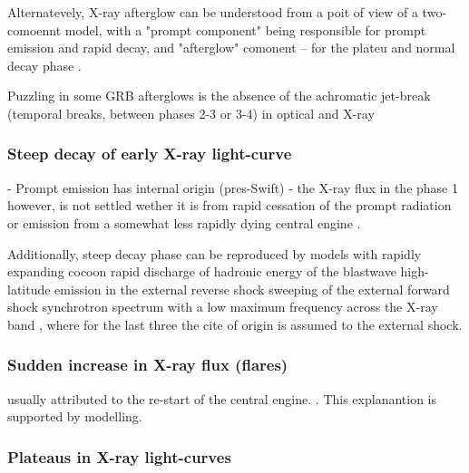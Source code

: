 Alternatevely, X-ray afterglow can be understood from a poit of view of a two-comoennt model, with a "prompt component" being responsible for prompt emission and rapid decay, and "afterglow" comonent -- for the plateu and normal decay phase \cite{O'Brien et al., 2006; Willingale et al., 2007; Ghisellini et al., 2009}.

Puzzling in some GRB afterglows is the absence of the achromatic jet-break (temporal breaks, between phases 2-3 or 3-4) in optical and X-ray \cite{Panaitescu et al., 2006a; Fan et al., 2006; Liang et al., 2007a, 2008a; Huang et al., 2007}


\subsubsection{Steep decay of early X-ray light-curve}

- Prompt emission has internal origin (pres-Swift)
- the X-ray flux in the phase 1 however, is not settled wether it is from rapid cessation of the prompt radiation \cite{(Kumar and Panaitescu, 2000a; Zhang et al., 2006} or emission from a somewhat less
rapidly dying central engine \cite{Fan and Wei, 2005; Barniol Duran and Kumar, 2009}.

Additionally, steep decay phase can be reproduced by models with rapidly expanding cocoon \cite{Pe'er et al., 2006a} rapid discharge of hadronic energy of the blastwave \cite{Dermer, 2007} high-latitude emission in the external reverse shock \cite{Uhm and Beloborodov, 2007; Uhm et al., 2012} sweeping of the external forward shock synchrotron spectrum with a low maximum frequency across the X-ray band \cite{Petropoulou et al., 2011}, where for the last three the cite of origin is assumed to the external shock.


\subsubsection{Sudden increase in X-ray flux (flares)}

usually attributed to the re-start of the central engine. \cite{Burrows et al., 2005b; Zhang et al., 2006; Fan and Wei, 2005).}. This explanantion is supported by modelling.


\subsubsection{Plateaus in X-ray light-curves}

